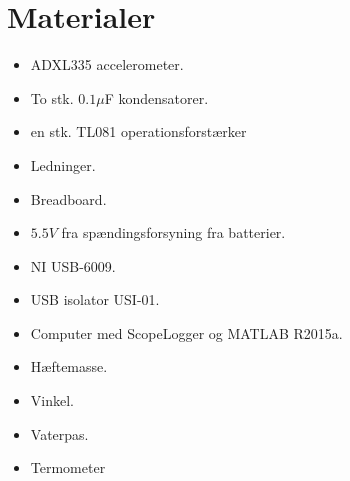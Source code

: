 \section{Materialer}
\begin{itemize}
\item ADXL335 accelerometer.
\item To stk. $0.1\mu$F kondensatorer.
\item en stk. TL081 operationsforstærker
\item Ledninger.
\item Breadboard.
\item $5.5V$ fra spændingsforsyning fra batterier.
\item NI USB-6009.
\item USB isolator USI-01.
\item Computer med ScopeLogger og MATLAB R2015a.
\item Hæftemasse.
\item Vinkel.
\item Vaterpas.
\item Termometer
\end{itemize}

